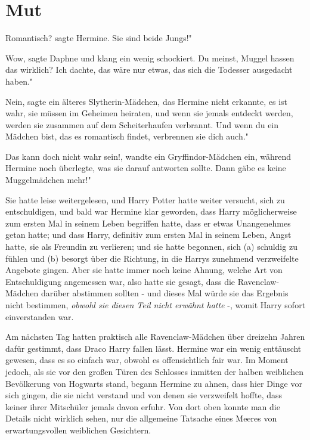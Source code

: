 \chapter{Mut}

\glqq{}Romantisch?\grqq{} sagte Hermine. \glqq{}Sie sind beide Jungs!"

\glqq{}Wow\grqq{}, sagte Daphne und klang ein wenig schockiert. \glqq{}Du meinst,
Muggel hassen das wirklich? Ich dachte, das wäre nur etwas, das sich die
Todesser ausgedacht haben."

\glqq{}Nein\grqq{}, sagte ein älteres Slytherin-Mädchen, das Hermine nicht
erkannte, \glqq{}es ist wahr, sie müssen im Geheimen heiraten, und wenn sie
jemals entdeckt werden, werden sie zusammen auf dem Scheiterhaufen verbrannt.
Und wenn du ein Mädchen bist, das es romantisch findet, verbrennen sie dich
auch."

\glqq{}Das kann doch nicht wahr sein!\grqq{}, wandte ein Gryffindor-Mädchen ein,
während Hermine noch überlegte, was sie darauf antworten sollte. \glqq{}Dann gäbe
es keine Muggelmädchen mehr!"

Sie hatte leise weitergelesen, und Harry Potter hatte weiter versucht, sich zu
entschuldigen, und bald war Hermine klar geworden, dass Harry möglicherweise zum
ersten Mal in seinem Leben begriffen hatte, dass er etwas Unangenehmes getan
hatte; und dass Harry, definitiv zum ersten Mal in seinem Leben, Angst hatte,
sie als Freundin zu verlieren; und sie hatte begonnen, sich (a) schuldig zu
fühlen und (b) besorgt über die Richtung, in die Harrys zunehmend verzweifelte
Angebote gingen. Aber sie hatte immer noch keine Ahnung, welche Art von
Entschuldigung angemessen war, also hatte sie gesagt, dass die Ravenclaw-Mädchen
darüber abstimmen sollten - und dieses Mal würde sie das Ergebnis nicht
bestimmen, \emph{obwohl sie diesen Teil nicht erwähnt hatte} -, womit Harry
sofort einverstanden war.

Am nächsten Tag hatten praktisch alle Ravenclaw-Mädchen über dreizehn Jahren
dafür gestimmt, dass Draco Harry fallen lässt. Hermine war ein wenig enttäuscht
gewesen, dass es so einfach war, obwohl es offensichtlich fair war. Im Moment
jedoch, als sie vor den großen Türen des Schlosses inmitten der halben
weiblichen Bevölkerung von Hogwarts stand, begann Hermine zu ahnen, dass hier
Dinge vor sich gingen, die sie nicht verstand und von denen sie verzweifelt
hoffte, dass keiner ihrer Mitschüler jemals davon erfuhr. Von dort oben konnte
man die Details nicht wirklich sehen, nur die allgemeine Tatsache eines Meeres
von erwartungsvollen weiblichen Gesichtern.


